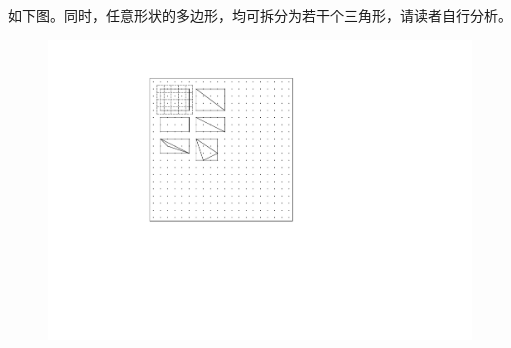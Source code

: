 \begin{itemize}[leftmargin=\inteval{\myitemleftmargin}pt,itemsep=
   \inteval{\myitemitempsep}pt,topsep=\inteval{\myitemtopsep}pt]
如下图。同时，任意形状的多边形，均可拆分为若干个三角形，请读者自行分析。
\begin{figure}[H]
    \centering
    \includegraphics[width=0.65\linewidth]{PDF_Picture/任意三角形-皮克公式}
\end{figure}


\end{itemize}
